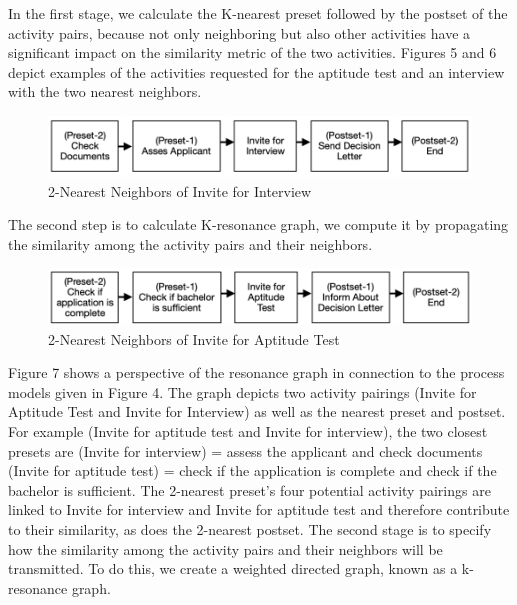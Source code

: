 \documentclass[runningheads]{llncs}
\begin{document}
In the first stage, we calculate the K-nearest preset followed by the postset of the activity pairs, because not only neighboring but also other activities have a significant impact on the similarity metric of the two activities. Figures 5 and 6 depict examples of the activities requested for the aptitude test and an interview with the two nearest neighbors.
\begin{figure}
    \centering
    \includegraphics[width = \textwidth]{Figures/Fig_5.PNG}
    \caption{2-Nearest Neighbors of Invite for Interview}
    \label{fig:5}
\end{figure}
The second step is to calculate K-resonance graph, we compute it by propagating the similarity among the activity pairs and their neighbors.
\begin{figure}
    \centering
    \includegraphics[width = \textwidth]{Figures/Fig_6.PNG}
    \caption{2-Nearest Neighbors of Invite for Aptitude Test}
    \label{fig:6}
\end{figure}
Figure 7 shows a perspective of the resonance graph in connection to the process models given in Figure 4. The graph depicts two activity pairings (Invite for Aptitude Test and Invite for Interview) as well as the nearest preset and postset. For example (Invite for aptitude test and Invite for interview), the two closest presets are (Invite for interview) = assess the applicant and check documents (Invite for aptitude test) = check if the application is complete and check if the bachelor is sufficient. The 2-nearest preset's four potential activity pairings are linked to Invite for interview and Invite for aptitude test and therefore contribute to their similarity, as does the 2-nearest postset. The second stage is to specify how the similarity among the activity pairs and their neighbors will be transmitted. To do this, we create a weighted directed graph, known as a k-resonance graph.\newline
\end{document}
